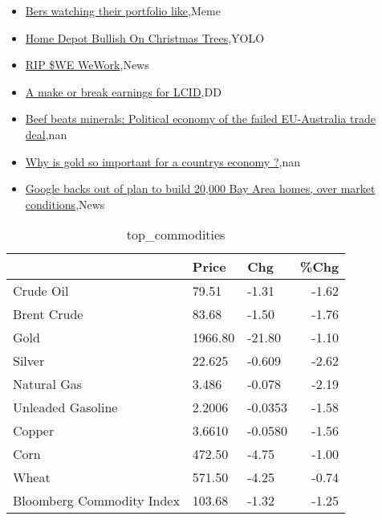 \documentclass{article}%
\begin{document}
%
\begin{itemize}%
\item%
\href{https://reddit.com/r/wallstreetbets/comments/17pr485/bers\_watching\_their\_portfolio\_like/}{Bers watching their portfolio like},Meme%
\item%
\href{https://reddit.com/r/wallstreetbets/comments/17pna79/home\_depot\_bullish\_on\_christmas\_trees/}{Home Depot Bullish On Christmas Trees},YOLO%
\item%
\href{https://reddit.com/r/wallstreetbets/comments/17plcw4/rip\_we\_wework/}{RIP \$WE WeWork},News%
\item%
\href{https://reddit.com/r/wallstreetbets/comments/17pkugd/a\_make\_or\_break\_earnings\_for\_lcid/}{A make or break earnings for LCID},DD%
\item%
\href{https://reddit.com/r/Economics/comments/17phbtt/beef\_beats\_minerals\_political\_economy\_of\_the/}{Beef beats minerals: Political economy of the failed EU-Australia trade deal},nan%
\item%
\href{https://reddit.com/r/Economics/comments/17pgvyd/why\_is\_gold\_so\_important\_for\_a\_countrys\_economy/}{Why is gold so important for a countrys economy ?},nan%
\item%
\href{https://reddit.com/r/Economics/comments/17pbjyl/google\_backs\_out\_of\_plan\_to\_build\_20000\_bay\_area/}{Google backs out of plan to build 20,000 Bay Area homes, over market conditions},News%
\end{itemize}%


\begin{table}[htbp]%
\caption{top\_commodities}%
\centering%
\begin{adjustbox}{width=1\textwidth}%
\begin{tabular}{lllr}
\toprule
                          &   Price &     Chg &  \%Chg \\
\midrule
               Crude Oil  &   79.51 &   -1.31 & -1.62 \\
             Brent Crude  &   83.68 &   -1.50 & -1.76 \\
                    Gold  & 1966.80 &  -21.80 & -1.10 \\
                  Silver  &  22.625 &  -0.609 & -2.62 \\
             Natural Gas  &   3.486 &  -0.078 & -2.19 \\
       Unleaded Gasoline  &  2.2006 & -0.0353 & -1.58 \\
                  Copper  &  3.6610 & -0.0580 & -1.56 \\
                    Corn  &  472.50 &   -4.75 & -1.00 \\
                   Wheat  &  571.50 &   -4.25 & -0.74 \\
Bloomberg Commodity Index &  103.68 &   -1.32 & -1.25 \\
\bottomrule
\end{tabular}
%
\end{adjustbox}%
\end{table}
\end{document}
